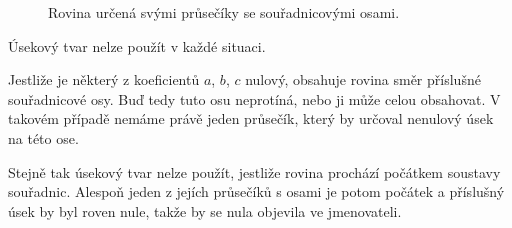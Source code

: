 \begin{figure}[H]
    \centering

    \caption{Rovina určená svými průsečíky se souřadnicovými osami.}
    \label{fig:Plane_intercept_form}
\end{figure}

Úsekový tvar nelze použít v každé situaci.

Jestliže je některý z koeficientů $a$, $b$, $c$ nulový, obsahuje rovina
směr příslušné souřadnicové osy. Buď tedy tuto osu neprotíná, nebo ji
může celou obsahovat. V takovém případě nemáme právě jeden průsečík,
který by určoval nenulový úsek na této ose.

Stejně tak úsekový tvar nelze použít, jestliže rovina prochází počátkem
soustavy souřadnic. Alespoň jeden z jejích průsečíků s osami je potom
počátek a příslušný úsek by byl roven nule, takže by se nula objevila
ve jmenovateli.
